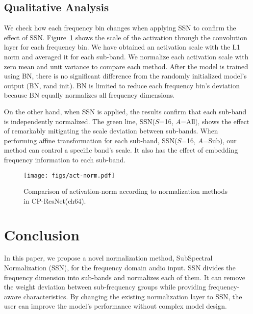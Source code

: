 \documentclass{article}
\begin{document}
\subsection{Qualitative Analysis}
We check how each frequency bin changes when applying SSN to confirm the effect of SSN. Figure~\ref{fig:actnorm} shows the scale of the activation through the convolution layer for each frequency bin. We have obtained an activation scale with the L1 norm and averaged it for each sub-band. We normalize each activation scale with zero mean and unit variance to compare each method. After the model is trained using BN, there is no significant difference from the randomly initialized model's output (BN, rand init). BN is limited to reduce each frequency bin's deviation because BN equally normalizes all frequency dimensions.

On the other hand, when SSN is applied, the results confirm that each sub-band is independently normalized. The green line, SSN($S$=16, $A$=All), shows the effect of remarkably mitigating the scale deviation between sub-bands. When performing affine transformation for each sub-band, SSN($S$=16, $A$=Sub), our method can control a specific band's scale. It also has the effect of embedding frequency information to each sub-band.

\begin{figure}[t]
\centering
\texttt{[image: figs/act-norm.pdf]}
\vskip -0.2in
\caption{Comparison of activation-norm according to normalization methods in CP-ResNet(ch64). 
}
\label{fig:actnorm}
\end{figure}

\section{Conclusion}
\label{sec:conclusion}
In this paper, we propose a novel normalization method, SubSpectral Normalization (SSN), for the frequency domain audio input.  
SSN divides the frequency dimension into sub-bands and normalizes each of them. 
It can remove the weight deviation between sub-frequency groups while providing frequency-aware characteristics.
By changing the existing normalization layer to SSN, the user can improve the model's performance without complex model design.

\vfill\pagebreak



\end{document}
